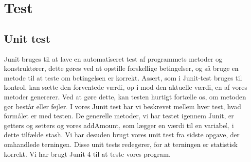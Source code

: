 \chapter{Test}

\section{Unit test}
Junit bruges til at lave en automatiseret test af programmets metoder og konstruktører, dette gøres ved at opstille forskellige betingelser, og så bruge en metode til at teste om betingelsen er korrekt. 
Assert, som i Junit-test bruges til kontrol, kan sætte den forventede værdi, op i mod den aktuelle værdi, en af vores metoder genererer. 
Ved at gøre dette, kan testen hurtigt fortælle os, om metoden gør består eller fejler. 
I vores Junit test har vi beskrevet mellem hver test, hvad formålet er med testen. 
De generelle metoder, vi har testet igennem Junit, er getters og setters og vores addAmount, som lægger en værdi til en variabel, i dette tilfælde stash. Vi har desuden brugt vores unit test fra sidste opgave, der omhandlede terningen. Disse unit tests redegører, for at terningen er statistisk korrekt. Vi har brugt Junit 4 til at teste vores program.

